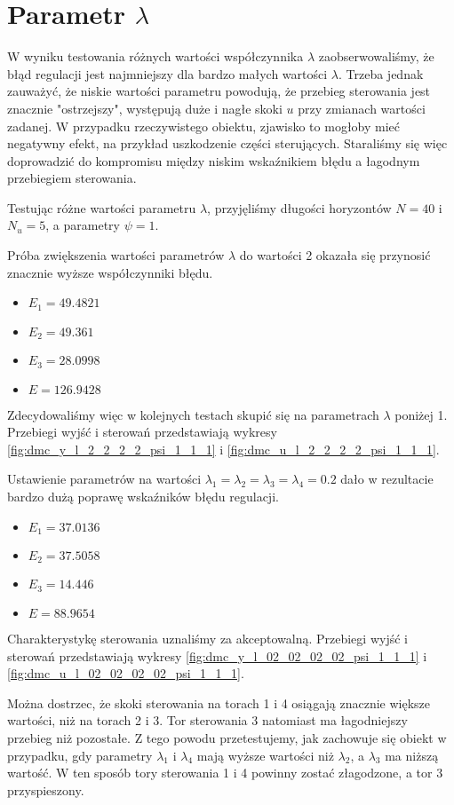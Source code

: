 \section{Parametr $\lambda$}
W wyniku testowania różnych wartości współczynnika $\lambda$ zaobserwowaliśmy, że błąd regulacji jest najmniejszy dla bardzo małych wartości $\lambda$. Trzeba jednak zauważyć, że niskie wartości parametru powodują, że przebieg sterowania jest znacznie "ostrzejszy", występują duże i nagłe skoki $u$ przy zmianach wartości zadanej. W przypadku rzeczywistego obiektu, zjawisko to mogłoby mieć negatywny efekt, na przykład uszkodzenie części sterujących. Staraliśmy się więc doprowadzić do kompromisu między niskim wskaźnikiem błędu a łagodnym przebiegiem sterowania.

Testując różne wartości parametru $\lambda$, przyjęliśmy długości horyzontów $N=40$ i $N_u=5$, a parametry $\psi = 1$.

Próba zwiększenia wartości parametrów $\lambda$ do wartości 2 okazała się przynosić znacznie wyższe współczynniki błędu.
\begin{itemize}
\item $E_1=\num{49,4821}$
\item $E_2=\num{49,361}$
\item $E_3=\num{28,0998}$
\item $E=\num{126,9428}$
\end{itemize}
Zdecydowaliśmy więc w kolejnych testach skupić się na parametrach $\lambda$ poniżej 1. Przebiegi wyjść i sterowań przedstawiają wykresy \ref{fig:dmc_y_l_2_2_2_2_psi_1_1_1} i \ref{fig:dmc_u_l_2_2_2_2_psi_1_1_1}.

Ustawienie parametrów na wartości $\lambda_1=\lambda_2=\lambda_3=\lambda_4=\num{0,2}$ dało w rezultacie bardzo dużą poprawę wskaźników błędu regulacji.
\begin{itemize}
\item $E_1=\num{37,0136}$
\item $E_2=\num{37,5058}$
\item $E_3=\num{14,446}$
\item $E=\num{88,9654}$
\end{itemize}
Charakterystykę sterowania uznaliśmy za akceptowalną. Przebiegi wyjść i sterowań przedstawiają wykresy \ref{fig:dmc_y_l_02_02_02_02_psi_1_1_1} i \ref{fig:dmc_u_l_02_02_02_02_psi_1_1_1}.

 Można dostrzec, że skoki sterowania na torach 1 i 4 osiągają znacznie większe wartości, niż na torach 2 i 3. Tor sterowania 3 natomiast ma łagodniejszy przebieg niż pozostałe. Z tego powodu przetestujemy, jak zachowuje się obiekt w przypadku, gdy parametry $\lambda_1$ i $\lambda_4$ mają wyższe wartości niż $\lambda_2$, a $\lambda_3$ ma niższą wartość. W ten sposób tory sterowania 1 i 4 powinny zostać złagodzone, a tor 3 przyspieszony. 

